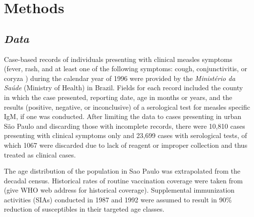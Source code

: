 \section{\texorpdfstring{\textbf{Methods}}{Methods}}\label{methods}

\subsection{\texorpdfstring{\emph{Data}}{Data}}\label{data}

Case-based records of individuals presenting with clinical measles symptoms (fever, rash, and at least one of the following symptoms: cough, conjunctivitis, or coryza \cite{Hutchins_2004}) during the calendar year of 1996 were provided by the \textit{Ministério da Saúde} (Ministry of Health) in Brazil. Fields for each record included the county in which the case presented, reporting date, age in months or years, and the results (positive, negative, or inconclusive) of a serological test for measles specific IgM, if one was conducted. After limiting the data to cases presenting in urban S\~{a}o Paulo and discarding those with incomplete records, there were 10,810 cases presenting with clinical symptoms only
and 23,699 cases with serological tests, of which 1067 were discarded due to lack of reagent or improper collection and thus treated as clinical cases.

The age distribution of the population in Sao Paulo was extrapolated from the decadal census. Historical rates of routine vaccination coverage were taken from (give WHO web address for historical coverage). Supplemental immunization activities (SIAs) conducted in 1987 and 1992 were assumed to result in 90\% reduction of susceptibles in their targeted age classes.